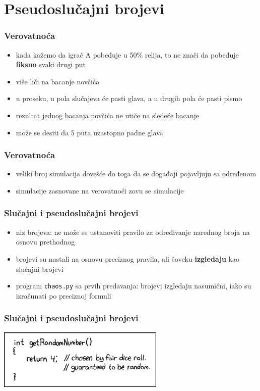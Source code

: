 \documentclass[utf8,compress]{beamer}
\begin{document}
\section[Random]{Pseudoslučajni brojevi}

\begin{frame}
  \frametitle{Verovatnoća}
  \begin{itemize}
    \item kada kažemo da igrač A pobeđuje u 50\% relija, to ne znači da pobeđuje \textbf{fiksno} svaki drugi put
    \item više liči na bacanje novčića
    \item u proseku, u pola slučajeva će pasti glava, a u drugih pola će pasti pismo
    \item rezultat jednog bacanja novčića ne utiče na sledeće bacanje
    \item može se desiti da 5 puta uzastopno padne glava
  \end{itemize}
\end{frame}

\begin{frame}
  \frametitle{Verovatnoća}
  \begin{itemize}
    \item veliki broj simulacija dovešće do toga da se događaji pojavljuju sa određenom 
    \item simulacije zasnovane na verovatnoći zovu se  simulacije
  \end{itemize}
\end{frame}

\begin{frame}
  \frametitle{Slučajni i pseudoslučajni brojevi}
  \begin{itemize}
    \item niz  brojeva: ne može se ustanoviti pravilo za određivanje narednog broja na osnovu prethodnog
    \item {} brojevi su nastali na osnovu preciznog pravila, ali čoveku \textbf{izgledaju} kao slučajni brojevi
    \item program \texttt{chaos.py} sa prvih predavanja: brojevi izgledaju nasumični, iako su izračunati po preciznoj formuli
  \end{itemize}
\end{frame}

\begin{frame}
  \frametitle{Slučajni i pseudoslučajni brojevi}
  \begin{center}
    \includegraphics[width=8cm]{pic31.png}
  \end{center}
\end{frame}
\end{document}
